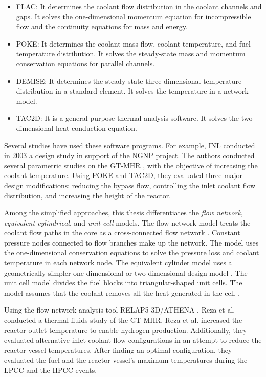 \begin{itemize}
\item FLAC: It determines the coolant flow distribution in the coolant channels and gaps.
It solves the one-dimensional momentum equation for incompressible flow and the continuity equations for mass and energy.

\item POKE: It determines the coolant mass flow, coolant temperature, and fuel temperature distribution.
It solves the steady-state mass and momentum conservation equations for parallel channels.

\item DEMISE: It determines the steady-state three-dimensional temperature distribution in a standard element.
It solves the temperature in a network model.

\item TAC2D: It is a general-purpose thermal analysis software.
It solves the two-dimensional heat conduction equation.
\end{itemize}

Several studies have used these software programs.
For example, \gls{INL} conducted in 2003 a design study \cite{macdonald_ngnp_2003} in support of the \gls{NGNP} project.
The authors conducted several parametric studies on the GT-MHR \cite{general_atomics_gas_1996}, with the objective of increasing the coolant temperature.
Using POKE and TAC2D, they evaluated three major design modifications: reducing the bypass flow, controlling the inlet coolant flow distribution, and increasing the height of the reactor.

Among the simplified approaches, this thesis differentiates the \textit{flow network}, \textit{equivalent cylindrical}, and \textit{unit cell} models.
The flow network model treats the coolant flow paths in the core as a cross-connected flow network \cite{shenoy_htgr_1974}.
Constant pressure nodes connected to flow branches make up the network.
The model uses the one-dimensional conservation equations to solve the pressure loss and coolant temperature in each network node.
The equivalent cylinder model uses a geometrically simpler one-dimensional or two-dimensional design model \cite{shenoy_htgr_1974}\cite{tak_numerical_2008}.
The unit cell model divides the fuel blocks into triangular-shaped unit cells.
The model assumes that the coolant removes all the heat generated in the cell \cite{tak_numerical_2008}.

Using the flow network analysis tool RELAP5-3D/ATHENA \cite{inl_relap5-3dathena_2005}, Reza et al. \cite{reza_design_2006} conducted a thermal-fluids study of the GT-MHR.
Reza et al. increased the reactor outlet temperature to enable hydrogen production.
Additionally, they evaluated alternative inlet coolant flow configurations in an attempt to reduce the reactor vessel temperatures.
After finding an optimal configuration, they evaluated the fuel and the reactor vessel's maximum temperatures during the \gls{LPCC} and the \gls{HPCC} events.

